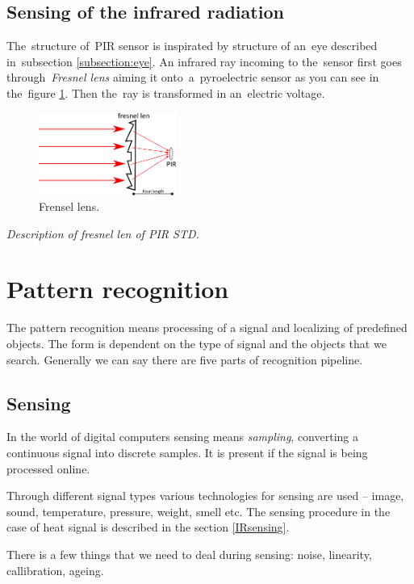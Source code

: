 \subsection*{Sensing of the infrared radiation}
The~structure of~PIR sensor is inspirated by structure of an~eye described in~subsection \ref{subsection:eye}.
An infrared ray incoming to the~sensor first goes through~{\it Fresnel lens} aiming it onto~a~pyroelectric sensor
as you can see in the~figure \ref{fig:fresnellens}. Then the~ray is transformed in an~electric voltage.

\begin{figure}[h!]
\begin{center}
\includegraphics[width=0.4\textwidth]{obrazky-figures/fresnellens.png}
\caption{Frensel lens.\label{fig:fresnellens}}
\end{center}
\end{figure}

{\it Description of fresnel len of PIR STD.}



\newpage
\section{Pattern recognition}
The pattern recognition means processing of a signal and localizing of predefined objects.
The form is dependent on the type of signal and the objects that we search. Generally we can say
there are five parts of recognition pipeline.

\subsection*{Sensing}
In the world of digital computers sensing means {\it sampling}, converting a continuous signal
into discrete samples. It is present if the signal is being processed online.

Through different signal types various technologies for sensing are used -- image, sound, temperature,
pressure, weight, smell etc. The sensing procedure in the case of heat signal is described in the section
\ref{IRsensing}.

There is a few things that we need to deal during sensing: noise, linearity, callibration, ageing.

